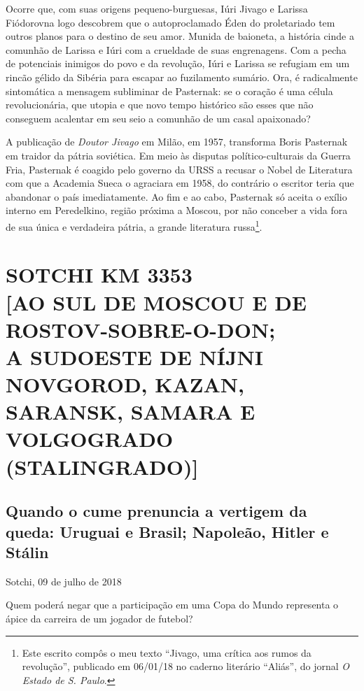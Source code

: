 Ocorre que, com suas origens pequeno-burguesas, Iúri Jivago e Larissa
Fiódorovna logo descobrem que o autoproclamado Éden do proletariado tem
outros planos para o destino de seu amor. Munida de baioneta, a história
cinde a comunhão de Larissa e Iúri com a crueldade de suas engrenagens.
Com a pecha de potenciais inimigos do povo e da revolução, Iúri e
Larissa se refugiam em um rincão gélido da Sibéria para escapar ao
fuzilamento sumário. Ora, é radicalmente sintomática a mensagem
subliminar de Pasternak: se o coração é uma célula revolucionária, que
utopia e que novo tempo histórico são esses que não conseguem acalentar
em seu seio a comunhão de um casal apaixonado?

A publicação de \emph{Doutor Jivago} em Milão, em 1957, transforma Boris
Pasternak em traidor da pátria soviética. Em meio às disputas
político-culturais da Guerra Fria, Pasternak é coagido pelo governo da
URSS a recusar o Nobel de Literatura com que a Academia Sueca o
agraciara em 1958, do contrário o escritor teria que abandonar o país
imediatamente. Ao fim e ao cabo, Pasternak só aceita o exílio interno em
Peredelkino, região próxima a Moscou, por não conceber a vida fora de
sua única e verdadeira pátria, a grande literatura russa\footnote{Este
  escrito compôs o meu texto ``Jivago, uma crítica aos rumos da
  revolução'', publicado em 06/01/18 no caderno literário ``Aliás'', do
  jornal \emph{O Estado de S. Paulo}.}.

\newpage
{}
\part*{SOTCHI KM 3353\\{[}AO SUL DE MOSCOU E DE ROSTOV-SOBRE-O-DON;\\A SUDOESTE DE NÍJNI NOVGOROD, KAZAN, SARANSK, SAMARA E VOLGOGRADO (STALINGRADO){]}}

\chapter*{Quando o cume prenuncia a vertigem da queda: Uruguai e Brasil; Napoleão, Hitler e Stálin}

\begin{flushright}
Sotchi, 09 de julho de 2018
\end{flushright}

Quem poderá negar que a participação em uma Copa do Mundo representa o
ápice da carreira de um jogador de futebol?

